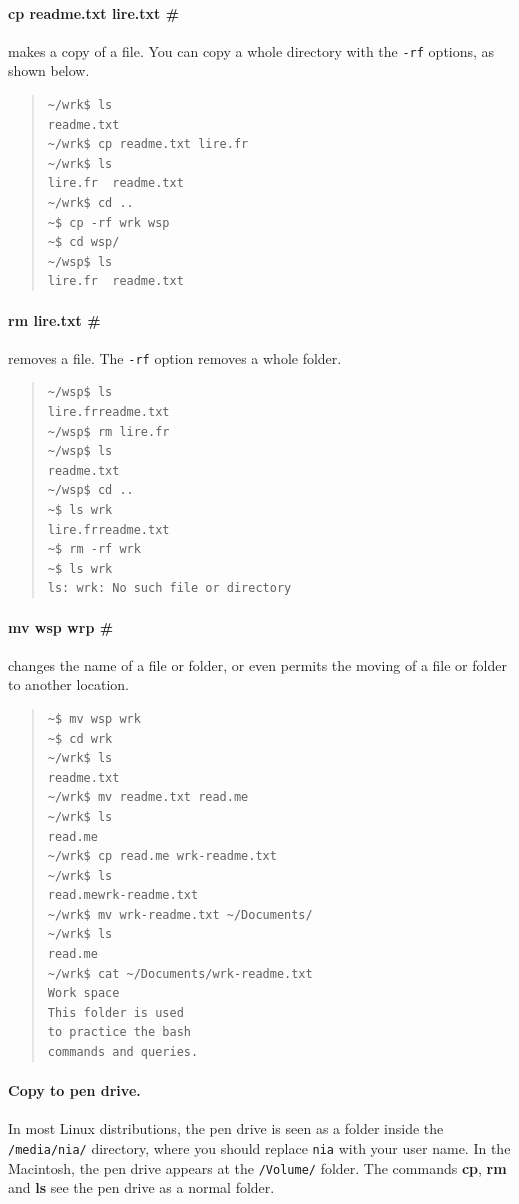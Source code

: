 \documentclass[a4paper,12pt]{book}
\begin{document}
\paragraph{cp readme.txt lire.txt \#} 
makes a copy
of a file. You can copy a whole directory
with the \verb|-rf| options, as shown below.
\begin{quote}
\begin{verbatim}
~/wrk$ ls
readme.txt
~/wrk$ cp readme.txt lire.fr
~/wrk$ ls
lire.fr  readme.txt
~/wrk$ cd ..
~$ cp -rf wrk wsp
~$ cd wsp/
~/wsp$ ls
lire.fr  readme.txt
\end{verbatim}
\end{quote}

\paragraph{rm lire.txt \#} 
removes a file.
The \verb|-rf| option 
removes a whole folder.
\begin{quote}
\begin{verbatim}
~/wsp$ ls
lire.frreadme.txt
~/wsp$ rm lire.fr
~/wsp$ ls
readme.txt
~/wsp$ cd ..
~$ ls wrk
lire.frreadme.txt
~$ rm -rf wrk
~$ ls wrk
ls: wrk: No such file or directory
\end{verbatim}
\end{quote}

\paragraph{mv wsp wrp \#} changes
the name of a file or folder, or
even permits the moving of a file or
folder to another location.
\begin{quote}
\begin{verbatim}
~$ mv wsp wrk
~$ cd wrk
~/wrk$ ls
readme.txt
~/wrk$ mv readme.txt read.me
~/wrk$ ls
read.me
~/wrk$ cp read.me wrk-readme.txt
~/wrk$ ls
read.mewrk-readme.txt
~/wrk$ mv wrk-readme.txt ~/Documents/
~/wrk$ ls
read.me
~/wrk$ cat ~/Documents/wrk-readme.txt
Work space
This folder is used
to practice the bash
commands and queries.
\end{verbatim}
\end{quote}

\paragraph{Copy to pen drive.}
In most Linux distributions, the pen drive is
seen as a folder inside the \verb|/media/nia/|
directory, where you should replace \verb|nia|
with your user name. In the Macintosh, the
pen drive appears at the \verb|/Volume/| folder.
The commands {\bf cp}, {\bf rm} and {\bf ls}
see the pen drive as a normal folder.
\end{document}
